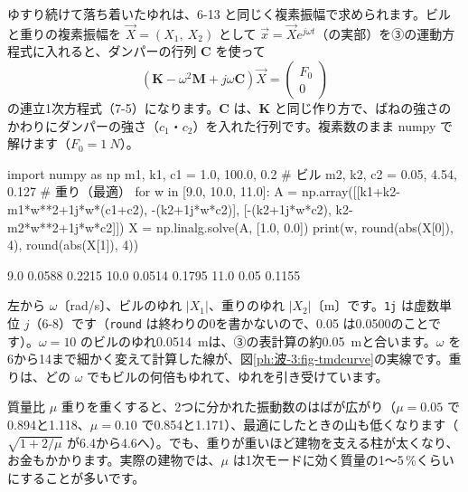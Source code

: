 ゆすり続けて落ち着いたゆれは、6-13 と同じく複素振幅で求められます。ビルと重りの複素振幅を $\vec X=(X_1,\ X_2)$ として $\vec x=\vec Xe^{j\omega t}$（の実部）を③の運動方程式に入れると、ダンパーの行列 $\mathbf C$ を使って
\[(\mathbf K-\omega^2\mathbf M+j\omega\mathbf C)\vec X=\begin{pmatrix}F_0\\0\end{pmatrix}\]
の連立1次方程式（7-5）になります。$\mathbf C$ は、$\mathbf K$ と同じ作り方で、ばねの強さのかわりにダンパーの強さ（$c_1$・$c_2$）を入れた行列です。複素数のまま numpy で解けます（$F_0=\qty{1}{N}$）。
\begin{phcode}[Python]
import numpy as np
m1, k1, c1 = 1.0, 100.0, 0.2       \# ビル
m2, k2, c2 = 0.05, 4.54, 0.127     \# 重り（最適）
for w in [9.0, 10.0, 11.0]:
    A = np.array([[k1+k2-m1*w**2+1j*w*(c1+c2), -(k2+1j*w*c2)],
                  [-(k2+1j*w*c2), k2-m2*w**2+1j*w*c2]])
    X = np.linalg.solve(A, [1.0, 0.0])
    print(w, round(abs(X[0]), 4), round(abs(X[1]), 4))
\end{phcode}
\begin{phcodeout}
9.0 0.0588 0.2215
10.0 0.0514 0.1795
11.0 0.05 0.1155
\end{phcodeout}
左から $\omega$〔rad/s〕、ビルのゆれ $|X_1|$、重りのゆれ $|X_2|$〔m〕です。\texttt{1j} は虚数単位 $j$（6-8）です（\texttt{round} は終わりの0を書かないので、0.05 は0.0500のことです）。$\omega=10$ のビルのゆれ\qty{0.0514}{m}は、③の表計算の約\qty{0.05}{m}と合います。$\omega$ を6から14まで細かく変えて計算した線が、図\ref{ph:波-3:fig-tmdcurve}の実線です。重りは、どの $\omega$ でもビルの何倍もゆれて、ゆれを引き受けています。

\begin{phbaisuru}{質量比 $\mu$}
重りを重くすると、2つに分かれた振動数のはばが広がり（$\mu=0.05$ で0.894と1.118、$\mu=0.10$ で0.854と1.171）、最適にしたときの山も低くなります（$\sqrt{1+2/\mu}$ が6.4から4.6へ）。でも、重りが重いほど建物を支える柱が太くなり、お金もかかります。実際の建物では、$\mu$ は1次モードに効く質量の1〜5\,\%くらいにすることが多いです。
\par\smallskip\noindent{}
\end{phbaisuru}

